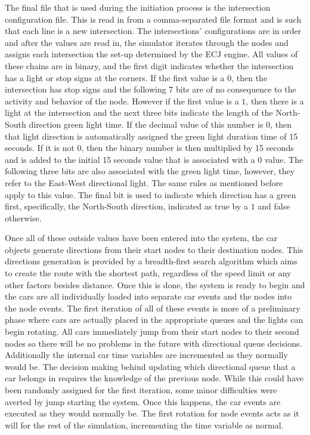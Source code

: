 The final file that is used during the initiation process is the intersection configuration file.  This is read in from a comma-separated file format and is such that each line is a new intersection.  The intersections' configurations are in order and after the values are read in, the simulator iterates through the nodes and assigns each intersection the set-up determined by the ECJ engine.  All values of these chains are in binary, and the first digit indicates whether the intersection has a light or stop signs at the corners.  If the first value is a $0$, then the intersection has stop signs and the following 7 bits are of no consequence to the activity and behavior of the node.  However if the first value is a $1$, then there is a light at the intersection and the next three bits indicate the length of the North- South direction green light time.  If the decimal value of this number is $0$, then that light direction is automatically assigned the green light duration time of 15 seconds.  If it is not $0$, then the binary number is then multiplied by 15 seconds and is added to the initial 15 seconds value that is associated with a $0$ value.  The following three bits are also associated with the green light time, however, they refer to the East-West directional light.  The same rules as mentioned before apply to this value.  The final bit is used to indicate which direction has a green first, specifically, the North-South direction, indicated as true by a $1$ and false otherwise.

Once all of these outside values have been entered into the system, the car objects generate directions from their start nodes to their destination nodes.  This directions generation is provided by a breadth-first search algorithm which aims to create the route with the shortest path, regardless of the speed limit or any other factors besides distance.  Once this is done, the system is ready to begin and the cars are all individually loaded into separate car events and the nodes into the node events.  The first iteration of all of these events is more of a preliminary phase where cars are actually placed in the appropriate queues and the lights can begin rotating.  All cars immediately jump from their start nodes to their second nodes so there will be no problems in the future with directional queue decisions.  Additionally the internal car time variables are incremented as they normally would be.  The decision making behind updating which directional queue that a car belongs in requires the knowledge of the previous node. While this could have been randomly assigned for the first iteration,  some minor difficulties were averted by jump starting the system.  Once this happens, the car events are executed as they would normally be.  The first rotation for node events acts as it will for the rest of the simulation, incrementing the time variable as normal.

